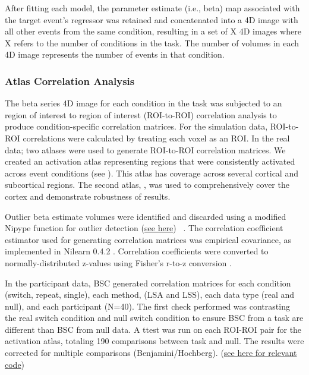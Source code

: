 \documentclass[10pt,letterpaper]{article}
\begin{document}
After fitting each model, the parameter estimate (i.e., beta) map
associated with the target event's regressor was retained and
concatenated into a 4D image with all other events from the same
condition, resulting in a set of X 4D images where X refers to the
number of conditions in the task.
The number of volumes in each 4D image represents the number of events in that condition.


\subsubsection*{Atlas Correlation Analysis}
\label{methods:atlas-corr-analysis}

The beta series 4D image for each condition in the task was subjected to
an region of interest to region of interest (ROI-to-ROI) correlation analysis
to produce condition-specific correlation matrices.
For the simulation data, ROI-to-ROI correlations were calculated by
treating each voxel as an ROI.
In the real data; two atlases were used to generate ROI-to-ROI correlation matrices.
We created an activation atlas representing regions that were
consistently activated across event conditions (see ).
This atlas has coverage across several cortical and subcortical regions.
The second atlas, \cite[Schaefer Atlas (400 parcels, 17 networks)]{Schaefer2017}, was
used to comprehensively cover the cortex and demonstrate robustness of results.

Outlier beta estimate volumes were identified and discarded using a
modified Nipype function for outlier detection
(\href{https://github.com/HBClab/NiBetaSeries/blob/a45c0a1f/src/nibetaseries/interfaces/nilearn.py#L153}{see here}) ~\cite{Crosby1994}.
The correlation coefficient estimator used for generating correlation matrices
was empirical covariance, as implemented in Nilearn 0.4.2
\cite{Abraham2014}.
Correlation coefficients were converted to normally-distributed z-values using
Fisher's r-to-z conversion \cite{Fisher1915}.

In the participant data, BSC generated correlation matrices for each condition (switch, repeat, single),
each method, (LSA and LSS), each data type (real and null), and each participant (N=40).
The first check performed was contrasting the real switch condition and null switch condition
to ensure BSC from a task are different than BSC from null data.
A ttest was run on each ROI-ROI pair for the activation atlas, totaling 190 comparisons
between task and null.
The results were corrected for multiple comparisons (Benjamini/Hochberg).
(\href{https://github.com/jdkent/BetaSeriesRealDataAnalysis/blob/90fafb5b83b2e1bfade61a9fb1a87f225efaa95f/nibsAnalysis/BetaSeriesAnalysis.ipynb}{see here for relevant code})
\end{document}
